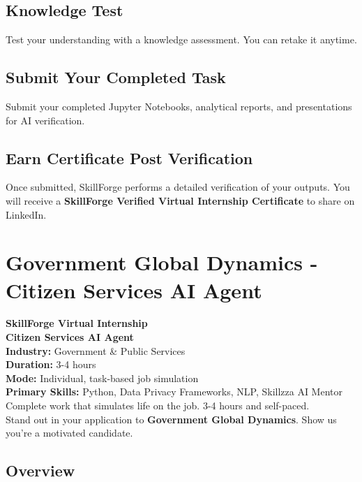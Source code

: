 \documentclass{article}
\begin{document}
\subsection*{Knowledge Test}
Test your understanding with a knowledge assessment. You can retake it anytime.\\

\subsection*{Submit Your Completed Task}
Submit your completed Jupyter Notebooks, analytical reports, and presentations for AI verification.\\

\subsection*{Earn Certificate Post Verification}
Once submitted, SkillForge performs a detailed verification of your outputs. You will receive a \textbf{SkillForge Verified Virtual Internship Certificate} to share on LinkedIn.\\

\newpage

\section{Government Global Dynamics - Citizen Services AI Agent}

\textbf{SkillForge Virtual Internship} \\
\textbf{Citizen Services AI Agent} \\

\textbf{Industry:} Government & Public Services \\
\textbf{Duration:} 3-4 hours \\
\textbf{Mode:} Individual, task-based job simulation \\
\textbf{Primary Skills:} Python, Data Privacy Frameworks, NLP, Skillzza AI Mentor \\

Complete work that simulates life on the job. 3-4 hours and self-paced. \\
Stand out in your application to \textbf{Government Global Dynamics}. Show us you're a motivated candidate. \\

\subsection*{Overview}
\end{document}
